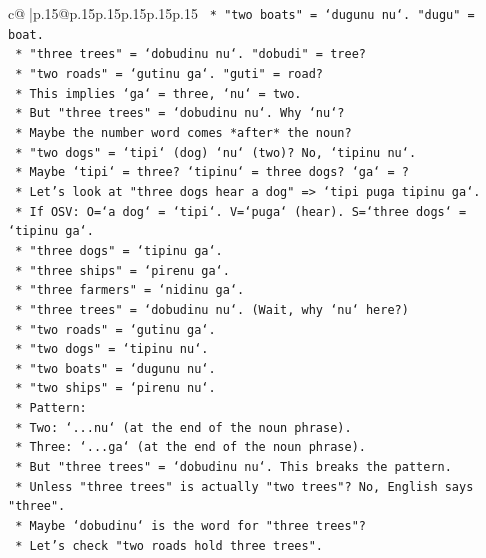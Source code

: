 \documentclass{article}
\begin{document}
{\begin{supertabular}{c@{$\;$}|p{.15\linewidth}@{}p{.15\linewidth}p{.15\linewidth}p{.15\linewidth}p{.15\linewidth}p{.15\linewidth}}
{{{\texttt{        *   "two boats" = `dugunu nu`. "dugu" = boat.} \\
\texttt{        *   "three trees" = `dobudinu nu`. "dobudi" = tree?} \\
\texttt{        *   "two roads" = `gutinu ga`. "guti" = road?} \\
\texttt{        *   This implies `ga` = three, `nu` = two.} \\
\texttt{        *   But "three trees" = `dobudinu nu`. Why `nu`?} \\
\texttt{        *   Maybe the number word comes *after* the noun?} \\
\texttt{        *   "two dogs" = `tipi` (dog) `nu` (two)? No, `tipinu nu`.} \\
\texttt{        *   Maybe `tipi` = three? `tipinu` = three dogs? `ga` = ?} \\
\texttt{        *   Let's look at "three dogs hear a dog" => `tipi puga tipinu ga`.} \\
\texttt{        *   If OSV: O=`a dog` = `tipi`. V=`puga` (hear). S=`three dogs` = `tipinu ga`.} \\
\texttt{        *   "three dogs" = `tipinu ga`.} \\
\texttt{        *   "three ships" = `pirenu ga`.} \\
\texttt{        *   "three farmers" = `nidinu ga`.} \\
\texttt{        *   "three trees" = `dobudinu nu`. (Wait, why `nu` here?)} \\
\texttt{        *   "two roads" = `gutinu ga`.} \\
\texttt{        *   "two dogs" = `tipinu nu`.} \\
\texttt{        *   "two boats" = `dugunu nu`.} \\
\texttt{        *   "two ships" = `pirenu nu`.} \\
\texttt{        *   Pattern:} \\
\texttt{            *   Two: `...nu` (at the end of the noun phrase).} \\
\texttt{            *   Three: `...ga` (at the end of the noun phrase).} \\
\texttt{        *   But "three trees" = `dobudinu nu`. This breaks the pattern.} \\
\texttt{        *   Unless "three trees" is actually "two trees"? No, English says "three".} \\
\texttt{        *   Maybe `dobudinu` is the word for "three trees"?} \\
\texttt{        *   Let's check "two roads hold three trees".} \\
}}}
\end{supertabular}}
\end{document}
